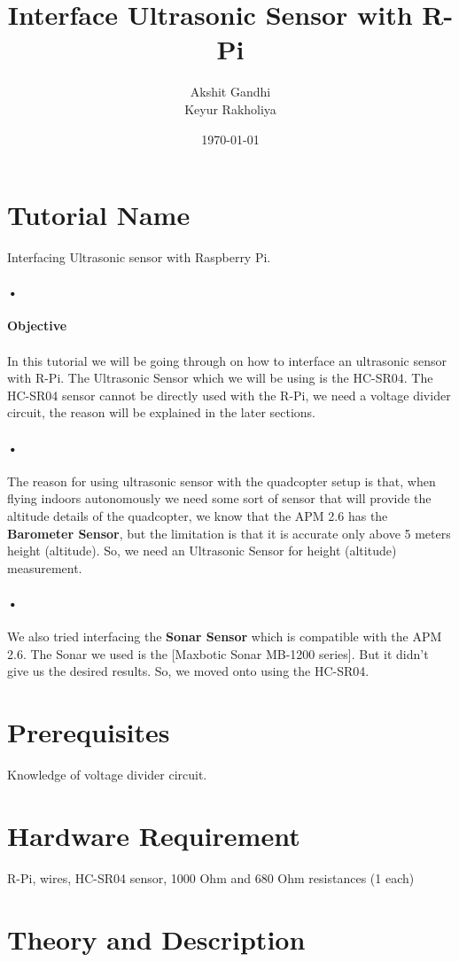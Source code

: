 \documentclass[11pt,a4paper]{article}
\title{Interface Ultrasonic Sensor with R-Pi}
\author{Akshit Gandhi \\ Keyur Rakholiya}
\date{\today}
\begin{document}
	\maketitle
	\newpage
	\tableofcontents
	\newpage
	\section{Tutorial Name}
		Interfacing Ultrasonic sensor with Raspberry Pi.
		\paragraph{•}
		\textbf{Objective}
		\paragraph{}In this tutorial we will be going through on how to interface an ultrasonic sensor with R-Pi. The Ultrasonic Sensor which we will be using is the HC-SR04. The HC-SR04 sensor cannot be directly used with the R-Pi, we need a voltage divider circuit, the reason will be explained in the later sections.
		\paragraph{•}The reason for using ultrasonic sensor with the quadcopter setup is that, when flying indoors autonomously we need some sort of sensor that will provide the altitude details of the quadcopter, we know that the APM 2.6 has the \textbf{Barometer Sensor}, but the limitation is that it is accurate only above 5 meters height (altitude). So, we need an Ultrasonic Sensor for height (altitude) measurement.
		\paragraph{•}We also tried interfacing the \textbf{Sonar Sensor} which is compatible with the APM 2.6. The Sonar we used is the [Maxbotic Sonar MB-1200 series]. But it didn't give us the desired results. So, we moved onto using the HC-SR04.
	\section{Prerequisites}
		Knowledge of voltage divider circuit.
	\section{Hardware Requirement}
		R-Pi, wires, HC-SR04 sensor, 1000 Ohm and 680 Ohm resistances (1 each)
	\section{Theory and Description}
\end{document}
